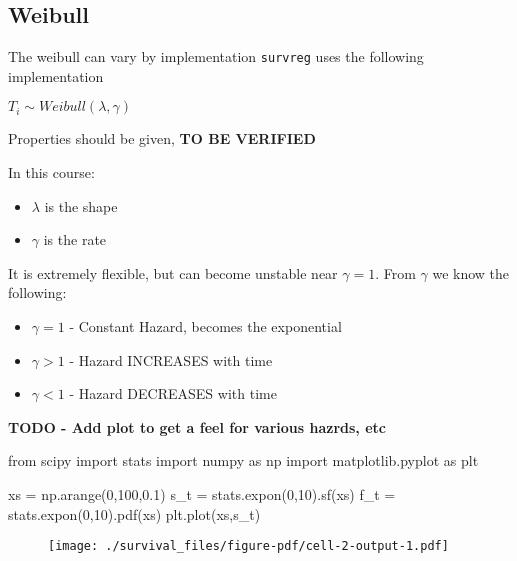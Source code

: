 \documentclass[
  letterpaper,
  DIV=11,
  numbers=noendperiod]{scrreprt}
\newenvironment{Shaded}{\begin{snugshade}}{\end{snugshade}}
\newcommand{\DecValTok}[1]{\textcolor[rgb]{0.68,0.00,0.00}{#1}}
\newcommand{\FloatTok}[1]{\textcolor[rgb]{0.68,0.00,0.00}{#1}}
\newcommand{\ImportTok}[1]{\textcolor[rgb]{0.00,0.46,0.62}{#1}}
\newcommand{\NormalTok}[1]{\textcolor[rgb]{0.00,0.23,0.31}{#1}}
\newcommand{\OperatorTok}[1]{\textcolor[rgb]{0.37,0.37,0.37}{#1}}
\providecommand{\tightlist}{%
  \setlength{\itemsep}{0pt}\setlength{\parskip}{0pt}}\usepackage{longtable,booktabs,array}
\begin{document}
\hypertarget{weibull}{%
\subsection{Weibull}\label{weibull}}

The weibull can vary by implementation \texttt{survreg} uses the
following implementation

\(T_i \sim Weibull(\lambda, \gamma)\)

Properties should be given, \textbf{TO BE VERIFIED}

In this course:

\begin{itemize}
\tightlist
\item
  \(\lambda\) is the shape
\item
  \(\gamma\) is the rate
\end{itemize}

It is extremely flexible, but can become unstable near \(\gamma = 1\).
From \(\gamma\) we know the following:

\begin{itemize}
\tightlist
\item
  \(\gamma = 1\) - Constant Hazard, becomes the exponential
\item
  \(\gamma > 1\) - Hazard INCREASES with time
\item
  \(\gamma < 1\) - Hazard DECREASES with time
\end{itemize}

\textbf{TODO - Add plot to get a feel for various hazrds, etc}

\begin{Shaded}
\begin{Highlighting}[]
\ImportTok{from}\NormalTok{ scipy }\ImportTok{import}\NormalTok{ stats}
\ImportTok{import}\NormalTok{ numpy }\ImportTok{as}\NormalTok{ np}
\ImportTok{import}\NormalTok{ matplotlib.pyplot }\ImportTok{as}\NormalTok{ plt}

\NormalTok{xs }\OperatorTok{=}\NormalTok{ np.arange(}\DecValTok{0}\NormalTok{,}\DecValTok{100}\NormalTok{,}\FloatTok{0.1}\NormalTok{)}
\NormalTok{s\_t }\OperatorTok{=}\NormalTok{ stats.expon(}\DecValTok{0}\NormalTok{,}\DecValTok{10}\NormalTok{).sf(xs)}
\NormalTok{f\_t }\OperatorTok{=}\NormalTok{ stats.expon(}\DecValTok{0}\NormalTok{,}\DecValTok{10}\NormalTok{).pdf(xs)}
\NormalTok{plt.plot(xs,s\_t)}
\end{Highlighting}
\end{Shaded}

\begin{figure}[H]

{\centering \texttt{[image: ./survival\_files/figure-pdf/cell-2-output-1.pdf]}

}

\end{figure}
\end{document}
